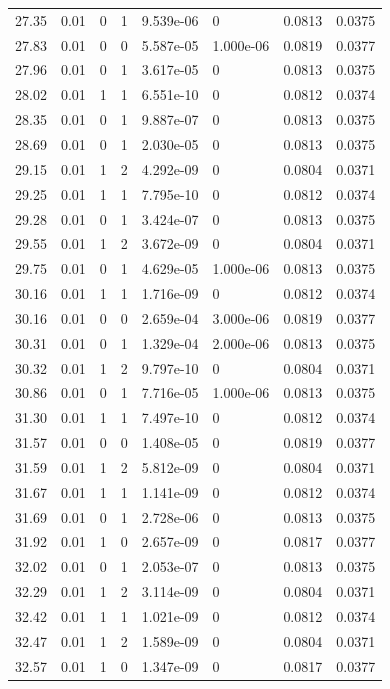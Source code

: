\documentclass[preview]{standalone}
\begin{document}
{{{{\begin{tabular}{L{1.2cm}C{1.2cm} C{0.3cm}C{0.5cm} C{1.4cm}C{1.4cm} C{1.4cm}C{1.4cm}}
  27.35  &  0.01  & 0     &  1 &  9.539e-06  & 0  & 0.0813 &  0.0375   \\ 
  27.83  &  0.01  & 0     &  0 &  5.587e-05  & 1.000e-06  & 0.0819 &  0.0377   \\ 
  27.96  &  0.01  & 0     &  1 &  3.617e-05  & 0  & 0.0813 &  0.0375   \\ 
  28.02  &  0.01  & 1     &  1 &  6.551e-10  & 0  & 0.0812 &  0.0374   \\ 
  28.35  &  0.01  & 0     &  1 &  9.887e-07  & 0  & 0.0813 &  0.0375   \\ 
  28.69  &  0.01  & 0     &  1 &  2.030e-05  & 0  & 0.0813 &  0.0375   \\ 
  29.15  &  0.01  & 1     &  2 &  4.292e-09  & 0  & 0.0804 &  0.0371   \\ 
  29.25  &  0.01  & 1     &  1 &  7.795e-10  & 0  & 0.0812 &  0.0374   \\ 
  29.28  &  0.01  & 0     &  1 &  3.424e-07  & 0  & 0.0813 &  0.0375   \\ 
  29.55  &  0.01  & 1     &  2 &  3.672e-09  & 0  & 0.0804 &  0.0371   \\ 
  29.75  &  0.01  & 0     &  1 &  4.629e-05  & 1.000e-06  & 0.0813 &  0.0375   \\ 
  30.16  &  0.01  & 1     &  1 &  1.716e-09  & 0  & 0.0812 &  0.0374   \\ 
  30.16  &  0.01  & 0     &  0 &  2.659e-04  & 3.000e-06  & 0.0819 &  0.0377   \\ 
  30.31  &  0.01  & 0     &  1 &  1.329e-04  & 2.000e-06  & 0.0813 &  0.0375   \\ 
  30.32  &  0.01  & 1     &  2 &  9.797e-10  & 0  & 0.0804 &  0.0371   \\ 
  30.86  &  0.01  & 0     &  1 &  7.716e-05  & 1.000e-06  & 0.0813 &  0.0375   \\ 
  31.30  &  0.01  & 1     &  1 &  7.497e-10  & 0  & 0.0812 &  0.0374   \\ 
  31.57  &  0.01  & 0     &  0 &  1.408e-05  & 0  & 0.0819 &  0.0377   \\ 
  31.59  &  0.01  & 1     &  2 &  5.812e-09  & 0  & 0.0804 &  0.0371   \\ 
  31.67  &  0.01  & 1     &  1 &  1.141e-09  & 0  & 0.0812 &  0.0374   \\ 
  31.69  &  0.01  & 0     &  1 &  2.728e-06  & 0  & 0.0813 &  0.0375   \\ 
  31.92  &  0.01  & 1     &  0 &  2.657e-09  & 0  & 0.0817 &  0.0377   \\ 
  32.02  &  0.01  & 0     &  1 &  2.053e-07  & 0  & 0.0813 &  0.0375   \\ 
  32.29  &  0.01  & 1     &  2 &  3.114e-09  & 0  & 0.0804 &  0.0371   \\ 
  32.42  &  0.01  & 1     &  1 &  1.021e-09  & 0  & 0.0812 &  0.0374   \\ 
  32.47  &  0.01  & 1     &  2 &  1.589e-09  & 0  & 0.0804 &  0.0371   \\ 
  32.57  &  0.01  & 1     &  0 &  1.347e-09  & 0  & 0.0817 &  0.0377   \\ 
\hline 
\end{tabular} 

}}}}
\end{document}
